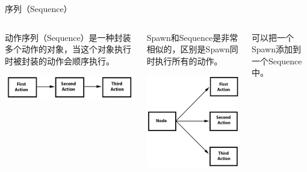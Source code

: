 \documentclass{beamer}
\begin{document}

\begin{frame}[fragile]{序列（Sequence）}
\begin{columns}
\begin{column}{0.3\textwidth}
动作序列（Sequence）是一种封装多个动作的对象，当这个对象执行时被封装的动作会顺序执行。

\vspace{1em}

\includegraphics[width=\textwidth]
{figures/sequence}
\end{column}
\begin{column}{0.3\textwidth}
Spawn和Sequence是非常相似的，区别是Spawn同时执行所有的动作。

\vspace{1em}

\includegraphics[width=\textwidth]
{figures/spawn}
\end{column}
\begin{column}{0.3\textwidth}
可以把一个Spawn添加到一个Sequence中。


\end{column}
\end{columns}
\end{frame}
\end{document}
